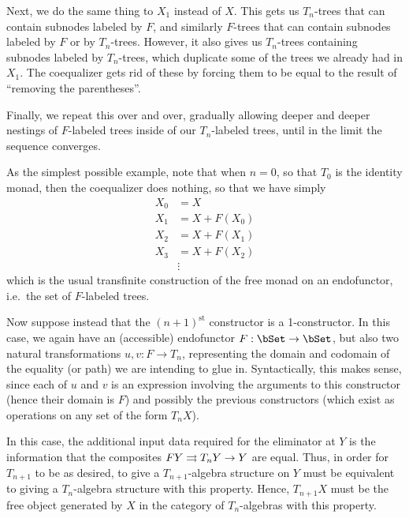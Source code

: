 \documentclass{amsart}
\begin{document}
Next, we do the same thing to $X_1$ instead of $X$.
This gets us $T_n$-trees that can contain subnodes labeled by $F$, and similarly $F$-trees that can contain subnodes labeled by $F$ or by $T_n$-trees.
However, it also gives us $T_n$-trees containing subnodes labeled by $T_n$-trees, which duplicate some of the trees we already had in $X_1$.
The coequalizer gets rid of these by forcing them to be equal to the result of ``removing the parentheses''.

Finally, we repeat this over and over, gradually allowing deeper and deeper nestings of $F$-labeled trees inside of our $T_n$-labeled trees, until in the limit the sequence converges.

As the simplest possible example, note that when $n=0$, so that $T_0$ is the identity monad, then the coequalizer does nothing, so that we have simply
\begin{align}
  X_0 &= X\\
  X_1 &= X + F(X_0)\\
  X_2 &= X + F(X_1)\\
  X_3 &= X + F(X_2)\\
  &\vdots
\end{align}
which is the usual transfinite construction of the free monad on an endofunctor, i.e.\ the set of $F$-labeled trees.

Now suppose instead that the $(n+1)^{\mathrm{st}}$ constructor is a 1-constructor.
In this case, we again have an (accessible) endofunctor $F:\bSet\to\bSet$, but also two natural transformations $u,v:F \to T_n$, representing the domain and codomain of the equality (or path) we are intending to glue in.
Syntactically, this makes sense, since each of $u$ and $v$ is an expression involving the arguments to this constructor (hence their domain is $F$) and possibly the previous constructors (which exist as operations on any set of the form $T_n X$).

In this case, the additional input data required for the eliminator at $Y$ is the information that the composites $F Y \rightrightarrows T_n Y \to Y$ are equal.
Thus, in order for $T_{n+1}$ to be as desired, to give a $T_{n+1}$-algebra structure on $Y$ must be equivalent to giving a $T_n$-algebra structure with this property.
Hence, $T_{n+1} X$ must be the free object generated by $X$ in the category of $T_n$-algebras with this property.
\end{document}
